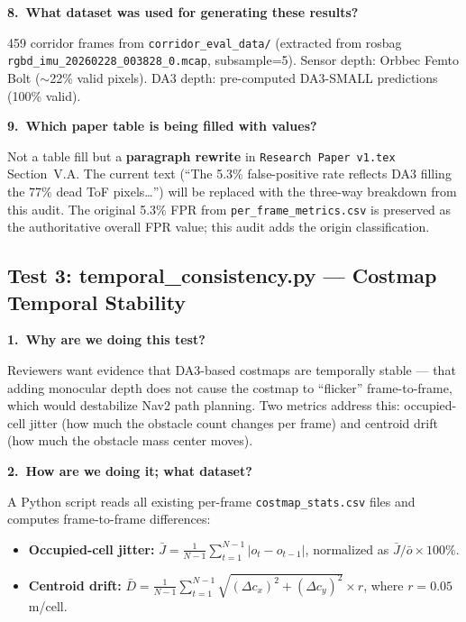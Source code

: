 \documentclass[11pt,a4paper]{article}
\begin{document}
\textbf{8.\ What dataset was used for generating these results?}

459 corridor frames from \texttt{corridor\_eval\_data/} (extracted from
rosbag \texttt{rgbd\_imu\_20260228\_003828\_0.mcap}, subsample=5).
Sensor depth: Orbbec Femto Bolt ($\sim$22\% valid pixels).
DA3 depth: pre-computed DA3-SMALL predictions (100\% valid).

\textbf{9.\ Which paper table is being filled with values?}

Not a table fill but a \textbf{paragraph rewrite} in
\texttt{Research Paper v1.tex} Section~V.A. The current text
(``The 5.3\% false-positive rate reflects DA3 filling the 77\% dead
ToF pixels\ldots'') will be replaced with the three-way breakdown
from this audit. The original 5.3\% FPR from
\texttt{per\_frame\_metrics.csv} is preserved as the authoritative
overall FPR value; this audit adds the origin classification.

\subsection{Test 3: temporal\_consistency.py --- Costmap Temporal Stability}
\label{sec:test-temporal}

\textbf{1.\ Why are we doing this test?}

Reviewers want evidence that DA3-based costmaps are temporally stable
--- that adding monocular depth does not cause the costmap to ``flicker''
frame-to-frame, which would destabilize Nav2 path planning. Two metrics
address this: occupied-cell jitter (how much the obstacle count changes
per frame) and centroid drift (how much the obstacle mass center moves).

\textbf{2.\ How are we doing it; what dataset?}

A Python script reads all existing per-frame \texttt{costmap\_stats.csv}
files and computes frame-to-frame differences:
\begin{itemize}[nosep]
  \item \textbf{Occupied-cell jitter:}
    $\bar{J} = \frac{1}{N-1}\sum_{t=1}^{N-1}|o_t - o_{t-1}|$,
    normalized as $\bar{J}/\bar{o} \times 100\%$.
  \item \textbf{Centroid drift:}
    $\bar{D} = \frac{1}{N-1}\sum_{t=1}^{N-1}\sqrt{(\Delta c_x)^2 +
    (\Delta c_y)^2} \times r$, where $r = 0.05$\,m/cell.
\end{itemize}
\end{document}
